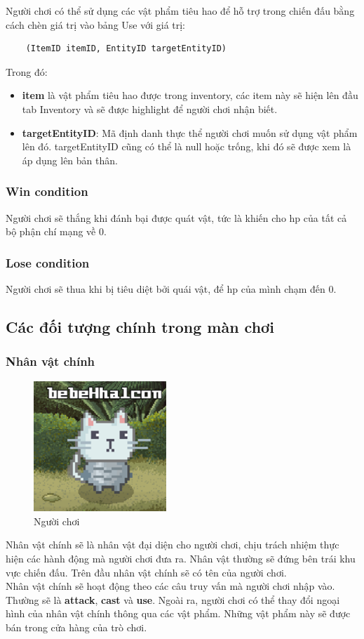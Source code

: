 Người chơi có thể sử dụng các vật phẩm tiêu hao để hỗ trợ trong chiến đấu bằng cách chèn giá trị vào bảng Use với giá trị:
\begin{verbatim}
	(ItemID itemID, EntityID targetEntityID)
\end{verbatim}
Trong đó:
\begin{itemize}
	\item  \textbf{item} là vật phẩm tiêu hao được trong inventory, các item này sẽ hiện lên đầu tab Inventory và sẽ được highlight để người chơi nhận biết.
	\item \textbf{targetEntityID}: Mã định danh thực thể người chơi muốn sử dụng vật phẩm lên đó. targetEntityID cũng có thể là null hoặc trống, khi đó sẽ được xem là áp dụng lên bản thân.
\end{itemize}

\subsubsection{Win condition}
Người chơi sẽ thắng khi đánh bại được quát vật, tức là khiến cho hp của tất cả bộ phận chí mạng về 0.
\subsubsection{Lose condition}
Người chơi sẽ thua khi bị tiêu diệt bởi quái vật, để hp của mình chạm đến 0.
\subsection{Các đối tượng chính trong màn chơi}
\subsubsection{Nhân vật chính}
\begin{figure}[H]
	\centering
	\includegraphics[width=5cm]{Images/Player.png}
	\vspace{0.5cm}
	\caption{Người chơi}
\end{figure}
\hspace*{0.5cm} Nhân vật chính sẽ là nhân vật đại diện cho người chơi, chịu trách nhiệm thực hiện các hành động mà người chơi đưa ra. Nhân vật thường sẽ đứng bên trái khu vực chiến đấu. Trên đầu nhân vật chính sẽ có tên của người chơi.\\
\hspace*{0.5cm} Nhân vật chính sẽ hoạt động theo các câu truy vấn mà người chơi nhập vào. Thường sẽ là \textbf{attack}, \textbf{cast} và \textbf{use}. Ngoài ra, người chơi có thể thay đổi ngoại hình của nhân vật chính thông qua các vật phẩm. Những vật phẩm này sẽ
được bán trong cửa hàng của trò chơi.
